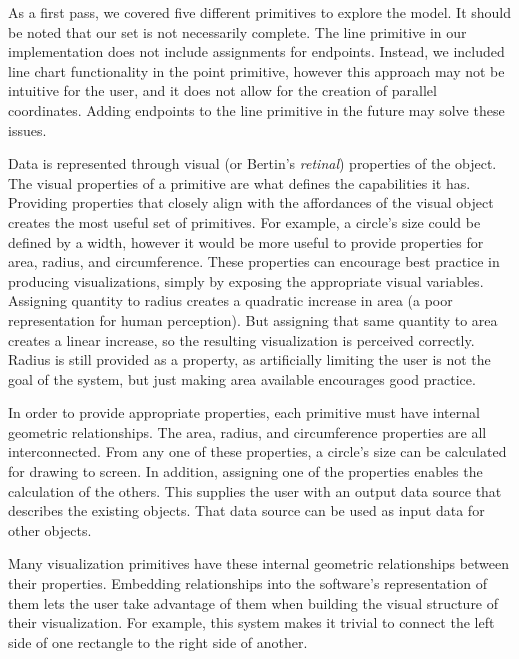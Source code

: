 As a first pass, we covered five different primitives to explore the model.
It should be noted that our set is not necessarily complete.
The line primitive in our implementation does not include assignments for endpoints.
Instead, we included line chart functionality in the point primitive, however this approach may not be intuitive for the user, and it does not allow for the creation of parallel coordinates.
Adding endpoints to the line primitive in the future may solve these issues.

\label{visualProperties}

Data is represented through visual (or Bertin's \textit{retinal}) properties of the object.
The visual properties of a primitive are what defines the capabilities it has.
Providing properties that closely align with the affordances of the visual object creates the most useful set of primitives.
For example, a circle's size could be defined by a width, however it would be more useful to provide properties for area, radius, and circumference.
These properties can encourage best practice in producing visualizations, simply by exposing the appropriate visual variables.
Assigning quantity to radius creates a quadratic increase in area (a poor representation for human perception).
But assigning that same quantity to area creates a linear increase, so the resulting visualization is perceived correctly.
Radius is still provided as a property, as artificially limiting the user is not the goal of the system, but just making area available encourages good practice.

In order to provide appropriate properties, each primitive must have internal geometric relationships.
The area, radius, and circumference properties are all interconnected.
From any one of these properties, a circle's size can be calculated for drawing to screen.
In addition, assigning one of the properties enables the calculation of the others.
This supplies the user with an output data source that describes the existing objects.
That data source can be used as input data for other objects.

\label{internalGeometricRelationships}

Many visualization primitives have these internal geometric relationships between their properties.
Embedding relationships into the software's representation of them lets the user take advantage of them when building the visual structure of their visualization.
For example, this system makes it trivial to connect the left side of one rectangle to the right side of another.

